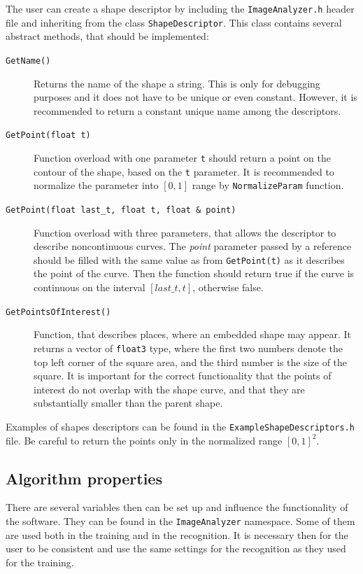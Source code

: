 The user can create a shape descriptor by including the \texttt{ImageAnalyzer.h} header file and inheriting from the class \texttt{ShapeDescriptor}. This class contains several abstract methods, that should be implemented:
\begin{description}
\item[\texttt{GetName()}] Returns the name of the shape a string. This is only for debugging purposes and it does not have to be unique or even constant. However, it is recommended to return a constant unique name among the descriptors.

\item[\texttt{GetPoint(\texttt{float} t)}] Function overload with one parameter \texttt{t} should return a point on the contour of the shape, based on the \texttt{t} parameter. It is recommended to normalize the parameter into $[0,1]$ range by \texttt{NormalizeParam} function.

\item[\texttt{GetPoint(float last\_t, float t, float \& point)}] Function overload with three parameters, that allows the descriptor to describe noncontinuous curves. The \emph{point} parameter passed by a reference should be filled with the same value as from \texttt{GetPoint(t)} as it describes the point of the curve. Then the function should return true if the curve is continuous on the interval $[last\_t, t]$, otherwise false.

\item[\texttt{GetPointsOfInterest()}] Function, that describes places, where an embedded shape may appear. It returns a vector of \texttt{float3} type, where the first two numbers denote the top left corner of the square area, and the third number is the size of the square. It is important for the correct functionality that the points of interest do not overlap with the shape curve, and that they are substantially smaller than the parent shape.
\end{description}

Examples of shapes descriptors can be found in the \texttt{ExampleShapeDescriptors.h} file. Be careful to return the points only in the normalized range $[0,1]^2$.

\subsection{Algorithm properties}
\label{sec:properties}
There are several variables then can be set up and influence the functionality of the software. They can be found in the \texttt{ImageAnalyzer} namespace. Some of them are used both in the training and in the recognition. It is necessary then for the user to be consistent and use the same settings for the recognition as they used for the training.

